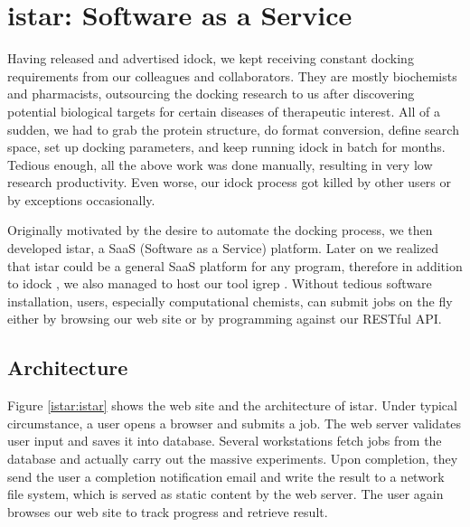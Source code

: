 \chapter{istar: Software as a Service}

Having released and advertised idock, we kept receiving constant docking requirements from our colleagues and collaborators. They are mostly biochemists and pharmacists, outsourcing the docking research to us after discovering potential biological targets for certain diseases of therapeutic interest. All of a sudden, we had to grab the protein structure, do format conversion, define search space, set up docking parameters, and keep running idock in batch for months. Tedious enough, all the above work was done manually, resulting in very low research productivity. Even worse, our idock process got killed by other users or by exceptions occasionally.

Originally motivated by the desire to automate the docking process, we then developed istar, a SaaS (Software as a Service) platform. Later on we realized that istar could be a general SaaS platform for any program, therefore in addition to idock \citep{1153}, we also managed to host our tool igrep \citep{1138}. Without tedious software installation, users, especially computational chemists, can submit jobs on the fly either by browsing our web site or by programming against our RESTful API.

\section{Architecture}

Figure \ref{istar:istar} shows the web site and the architecture of istar. Under typical circumstance, a user opens a browser and submits a job. The web server validates user input and saves it into database. Several workstations fetch jobs from the database and actually carry out the massive experiments. Upon completion, they send the user a completion notification email and write the result to a network file system, which is served as static content by the web server. The user again browses our web site to track progress and retrieve result.

